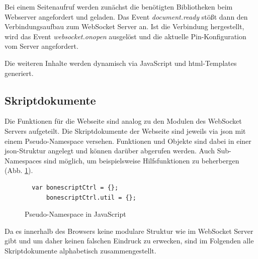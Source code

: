 Bei einem Seitenaufruf werden zunächst die benötigten Bibliotheken beim Webserver angefordert und geladen. Das Event \textit{document.ready} stößt dann den Verbindungsaufbau zum WebSocket Server an. Ist die Verbindung hergestellt, wird das Event \textit{websocket.onopen} ausgelöst und die aktuelle Pin-Konfiguration vom Server angefordert.

Die weiteren Inhalte werden dynamisch via JavaScript und \gls{html}-Templates generiert.


\subsection{Skriptdokumente}
Die Funktionen für die Webseite sind analog zu den Modulen des WebSocket Servers aufgeteilt. Die Skriptdokumente der Webseite sind jeweils via \gls{json} mit einem Pseudo-Namespace versehen. Funktionen und Objekte sind dabei in einer \gls{json}-Struktur angelegt und können darüber abgerufen werden. Auch Sub-Namespaces sind möglich, um beispielsweise Hilfsfunktionen zu beherbergen (Abb. \ref{lst:pseudeNamespaceJS}).

\begin{figure}[ht]
  \begin{lstlisting}
  var bonescriptCtrl = {};
      bonescriptCtrl.util = {};
  \end{lstlisting}
  \caption{Pseudo-Namespace in JavaScript}
  \label{lst:pseudeNamespaceJS}
\end{figure}

Da es innerhalb des Browsers keine modulare Struktur wie im WebSocket Server gibt und um daher keinen falschen Eindruck zu erwecken, sind im Folgenden alle Skriptdokumente alphabetisch zusammengestellt.

